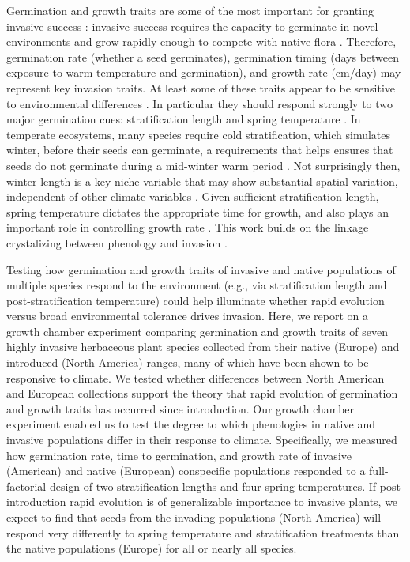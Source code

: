 \documentclass[12pt]{article}\usepackage[]{graphicx}\usepackage[]{color}
\begin{document}
	Germination and growth traits are some of the most important for granting invasive success \parencite{Sattin1997, Maillet2000}: invasive success requires the capacity to germinate in novel environments and grow rapidly enough to compete with native flora \parencite{Grime1988, Gioria2017}. Therefore, germination rate (whether a seed germinates), germination timing (days between exposure to warm temperature and germination), and growth rate (cm/day) may represent key invasion traits. At least some of these traits appear to be sensitive to environmental differences \parencite{Leger2007}.  In particular they should respond strongly to two major germination cues: stratification length and spring temperature \parencite{Finch2006}. In temperate ecosystems, many species require cold stratification, which simulates winter, before their seeds can germinate, a requirements that helps ensures that seeds do not germinate during a mid-winter warm period \parencite{Baskin1998,Popay1970,Wulff1994}. Not surprisingly then, winter length is a key niche variable \parencite{Harte2015} that may show substantial spatial variation, independent of other climate variables \parencite{Bonan2003}. Given sufficient stratification length, spring temperature dictates the appropriate time for growth, and also plays an important role in controlling growth rate \parencite{Egli1980,Guilioni2003}. This work builds on the linkage crystalizing between phenology and invasion \parencite[e.g.,][]{Seabloom:2003mg,Wolkovich2014}. %
	
Testing how germination and growth traits of invasive and native populations of multiple species respond to the environment (e.g., via stratification length and post-stratification temperature) could help illuminate whether rapid evolution versus broad environmental tolerance drives invasion. Here, we report on a growth chamber experiment comparing germination and growth traits of seven highly invasive herbaceous plant species collected from their native (Europe) and introduced (North America) ranges, many of which have been shown to be responsive to climate.  We tested whether differences between North American and European collections support the theory that rapid evolution of germination and growth traits has occurred since introduction. Our growth chamber experiment enabled us to test the degree to which phenologies in native and invasive populations differ in their response to climate.  Specifically, we measured how germination rate, time to germination, and growth rate of invasive (American) and native (European) conspecific populations responded to a full-factorial design of two stratification lengths and four spring temperatures. If post-introduction rapid evolution is of generalizable importance to invasive plants, we expect to find that seeds from the invading populations (North America) will respond very differently to spring temperature and stratification treatments than the native populations (Europe) for all or nearly all species. %
\end{document}
